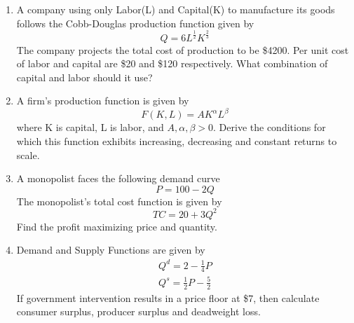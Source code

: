 \documentclass{article}
\begin{document}
\begin{enumerate}
\begin{itemize}
        \end{itemize}
        Find the accounting cost and economic cost associated with his business.
    \item 
        A company using only Labor(L) and Capital(K) to manufacture its goods follows the Cobb-Douglas production function given by 
        \[
        Q = 6L^\frac{1}{2}K^\frac{2}{3}
        \]
        The company projects the total cost of production to be \$4200. Per unit cost of labor and capital are \$20 and \$120 respectively. What combination of capital and labor should it use?
    \item 
        A firm's production function is given by 
        \[
        F(K,L) = AK^\alpha L^\beta 
        \]
        where K is capital, L is labor, and $A,\alpha,\beta > 0$. Derive the conditions for which this function exhibits increasing, decreasing and constant returns to scale.
    \item 
        A monopolist faces the following demand curve
        \[
        P=100-2Q
        \]
        The monopolist's total cost function is given by 
        \[
        TC=20+3Q^2
        \]
        Find the profit maximizing price and quantity.
    \item 
        Demand and Supply Functions are given by 
        \begin{align}
        Q^d = 2-\frac{1}{4}P \tag{1}\\
        Q^s = \frac{1}{2}P - \frac{5}{2} \tag{2}
        \end{align}
        If government intervention results in a price floor at \$7, then calculate consumer surplus, producer surplus and deadweight loss.
\end{enumerate}
\end{document}
